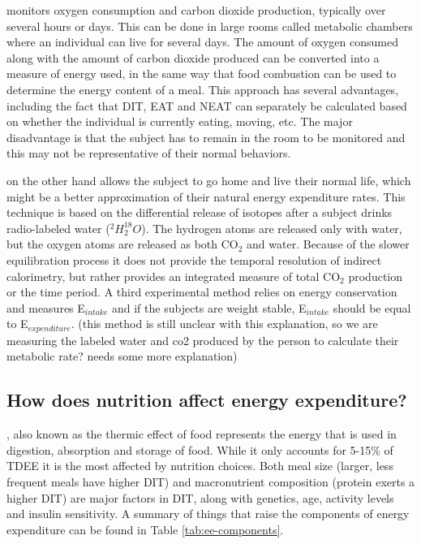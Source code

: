 \documentclass{tufte-handout}
\begin{document}
 monitors oxygen consumption and carbon dioxide production, typically over several hours or days.  This can be done in large rooms called metabolic chambers where an individual can live for several days.  The amount of oxygen consumed along with the amount of carbon dioxide produced can be converted into a measure of energy used, in the same way that food combustion can be used to determine the energy content of a meal.  This approach has several advantages, including the fact that DIT, EAT and NEAT can separately be calculated based on whether the individual is currently eating, moving, etc.  The major disadvantage is that the subject has to remain in the room to be monitored and this may not be representative of their normal behaviors.

 on the other hand allows the subject to go home and live their normal life, which might be a better approximation of their natural energy expenditure rates.  This technique is based on the differential release of isotopes after a subject drinks radio-labeled water ($^2H_2^{18}O$).  The hydrogen atoms are released only with water, but the oxygen atoms are released as both CO$_2$ and water.  Because of the slower equilibration process it does not provide the temporal resolution of indirect calorimetry, but rather provides an integrated measure of total CO$_2$ production or the time period.  A third experimental method relies on energy conservation and measures E$_{intake}$ and if the subjects are weight stable, E$_{intake}$ should be equal to E$_{expenditure}$. (this method is still unclear with this explanation, so we are measuring the labeled water and co2 produced by the person to calculate their metabolic rate? needs some more explanation) 

\subsection{How does nutrition affect energy expenditure?} 

, also known as the thermic effect of food represents the energy that is used in digestion, absorption and storage of food.  While it only accounts for 5-15\% of TDEE it is the most affected by nutrition choices.  Both meal size (larger, less frequent meals have higher DIT) and macronutrient composition (protein exerts a higher DIT) are major factors in DIT, along with genetics, age, activity levels and insulin sensitivity.  A summary of things that raise the components of energy expenditure can be found in Table \ref{tab:ee-components}.
\end{document}
